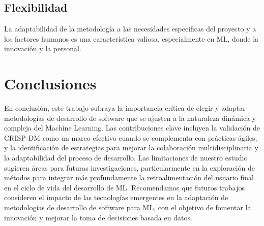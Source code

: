 \documentclass[journal]{IEEEtran}
\begin{document}
\subsection{Flexibilidad}

La adaptabilidad de la metodología a las necesidades específicas del proyecto y a los factores humanos es una característica valiosa, especialmente en ML, donde la innovación y la personal.\\

\section{Conclusiones}
En conclusión, este trabajo subraya la importancia crítica de elegir y adaptar metodologías de desarrollo de software que se ajusten a la naturaleza dinámica y compleja del Machine Learning. Las contribuciones clave incluyen la validación de CRISP-DM como un marco efectivo cuando se complementa con prácticas ágiles, y la identificación de estrategias para mejorar la colaboración multidisciplinaria y la adaptabilidad del proceso de desarrollo. Las limitaciones de nuestro estudio sugieren áreas para futuras investigaciones, particularmente en la exploración de métodos para integrar más profundamente la retroalimentación del usuario final en el ciclo de vida del desarrollo de ML. Recomendamos que futuros trabajos consideren el impacto de las tecnologías emergentes en la adaptación de metodologías de desarrollo de software para ML, con el objetivo de fomentar la innovación y mejorar la toma de decisiones basada en datos.




\end{document}
